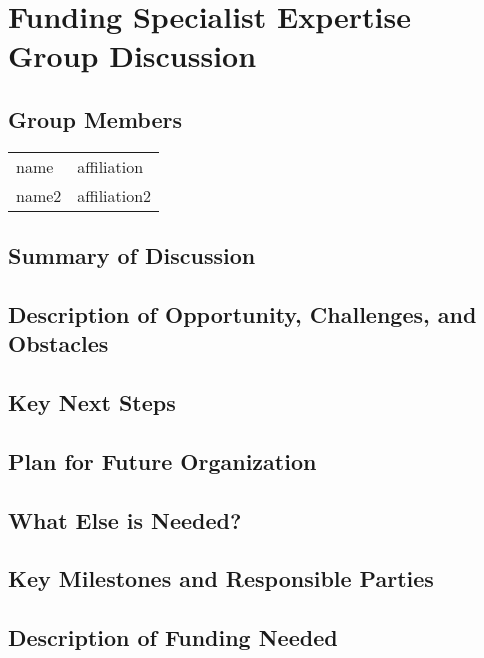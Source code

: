 \section{Funding Specialist Expertise Group Discussion}
\label{sec:appendix_funding_spec_expert}

\subsection{Group Members}
{\small
\begin{longtable}{ll}
   name            &  affiliation
\\ name2           &  affiliation2
\end{longtable}
}

\subsection{Summary of Discussion}

\subsection{Description of Opportunity, Challenges, and Obstacles}


\subsection{Key Next Steps}


\subsection{Plan for Future Organization}


\subsection{What Else is Needed?}


\subsection{Key Milestones and Responsible Parties}


\subsection{Description of Funding Needed}
